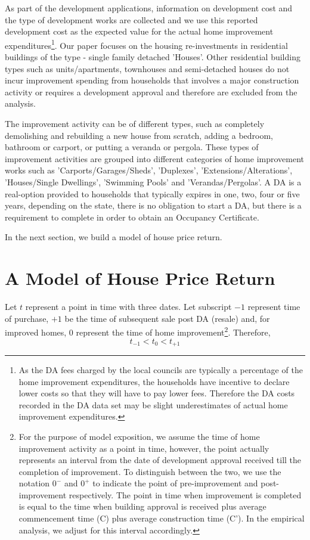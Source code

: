 \documentclass[AEJ,reqno, draftmode]{AEA} %
\begin{document}
As part of the development applications, information on development cost and the type of development works are collected and we use this reported development cost as the expected value for the actual home improvement expenditures\footnote{As the DA fees charged by the local councils are typically a percentage of the home improvement expenditures, the households have incentive to declare lower costs so that they will have to pay lower fees. Therefore the DA costs recorded in the DA data set may be slight underestimates of actual home improvement expenditures.}. Our paper focuses on the housing re-investments in residential buildings of the type - single family detached 'Houses'. Other residential building types such as units/apartments, townhouses and semi-detached houses do not incur improvement spending from households that involves a major construction activity or requires a development approval and therefore are excluded from the analysis.

The improvement activity can be of different types, such as completely demolishing and rebuilding a new house from scratch, adding a bedroom, bathroom or carport, or putting a veranda or pergola. These types of improvement activities are grouped into different categories of home improvement works such as 'Carports/Garages/Sheds', 'Duplexes', 'Extensions/Alterations', 'Houses/Single Dwellings', 'Swimming Pools' and 'Verandas/Pergolas'. A DA is a real-option provided to households that typically expires in one, two, four or five years, depending on the state, there is no obligation to start a DA, but there is a requirement to complete in order to obtain an Occupancy Certificate.


In the next section, we build a model of house price return.

\section{A Model of House Price Return}

Let $t$ represent a point in time with three dates. Let subscript $-1$ represent time of purchase, $+1$ be the time of subsequent sale post DA (resale) and, for improved homes, $0$ represent the time of home improvement\footnote{For the purpose of model exposition, we assume the time of home improvement activity as a point in time, however, the point actually represents an interval from the date of development approval received till the completion of improvement. To distinguish between the two, we use the notation $0^-$ and $0^+$ to indicate the point of pre-improvement and post-improvement respectively. The point in time when improvement is completed is equal to the time when building approval is received plus average commencement time (C) plus average construction time (C'). In the empirical analysis, we adjust for this interval accordingly.}. Therefore, $$t_{-1} < t_0 < t_{+1}$$ %
\end{document}
